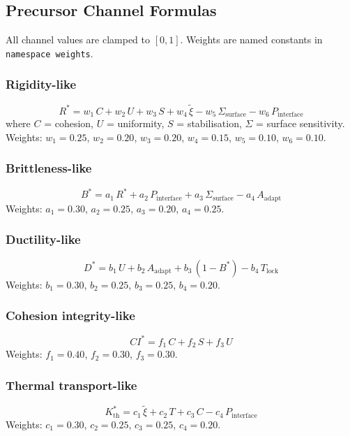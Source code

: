 \documentclass[11pt]{article}
\begin{document}
\subsection{Precursor Channel Formulas}
\label{sec:precursor_formulas}

All channel values are clamped to $[0, 1]$.
Weights are named constants in \texttt{namespace weights}.

\subsubsection{Rigidity-like}
\begin{equation}
  R^* = w_1\,C + w_2\,U + w_3\,S + w_4\,\tilde\xi
      - w_5\,\Sigma_\text{surface} - w_6\,P_\text{interface}
\end{equation}
where $C$ = cohesion, $U$ = uniformity, $S$ = stabilisation,
$\Sigma$ = surface sensitivity.
Weights: $w_1{=}0.25$, $w_2{=}0.20$, $w_3{=}0.20$, $w_4{=}0.15$,
$w_5{=}0.10$, $w_6{=}0.10$.

\subsubsection{Brittleness-like}
\begin{equation}
  B^* = a_1\,R^* + a_2\,P_\text{interface}
      + a_3\,\Sigma_\text{surface} - a_4\,A_\text{adapt}
\end{equation}
Weights: $a_1{=}0.30$, $a_2{=}0.25$, $a_3{=}0.20$, $a_4{=}0.25$.

\subsubsection{Ductility-like}
\begin{equation}
  D^* = b_1\,U + b_2\,A_\text{adapt} + b_3\,(1 - B^*) - b_4\,T_\text{lock}
\end{equation}
Weights: $b_1{=}0.30$, $b_2{=}0.25$, $b_3{=}0.25$, $b_4{=}0.20$.

\subsubsection{Cohesion integrity-like}
\begin{equation}
  CI^* = f_1\,C + f_2\,S + f_3\,U
\end{equation}
Weights: $f_1{=}0.40$, $f_2{=}0.30$, $f_3{=}0.30$.

\subsubsection{Thermal transport-like}
\begin{equation}
  K^*_\text{th} = c_1\,\tilde\xi + c_2\,T + c_3\,C - c_4\,P_\text{interface}
\end{equation}
Weights: $c_1{=}0.30$, $c_2{=}0.25$, $c_3{=}0.25$, $c_4{=}0.20$.
\end{document}
